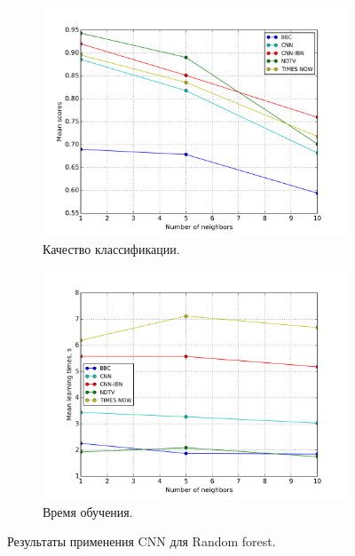 \begin{figure}[h!]
	\centering
	\begin{subfigure}{0.45\textwidth}
		\includegraphics[width=\textwidth]{images/cnn-randforest.png}
		\caption{Качество классификации.}
	\end{subfigure}
	\begin{subfigure}{0.45\textwidth}
		\includegraphics[width=\textwidth]{images/cnn-randforestTime.png}
		\caption{Время обучения.}
	\end{subfigure}
	\caption{Результаты применения CNN для Random forest.}\label{fig:cnn-rf-results}
\end{figure}


